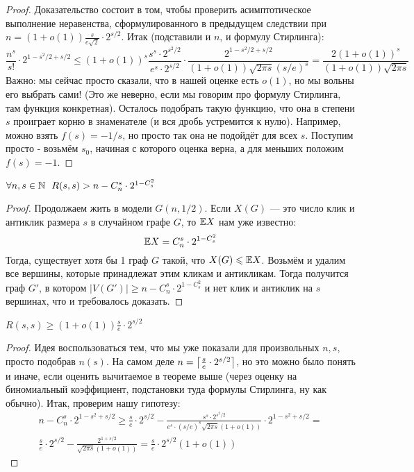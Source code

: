 \begin{proof}
	Доказательство состоит в том, чтобы проверить асимптотическое выполнение неравенства, сформулированного в предыдущем следствии при $n = (1 + o(1))\frac{s}{e\sqrt{2}} \cdot 2^{s / 2}$. Итак (подставили и $n$, и формулу Стирлинга):
	\[
		\frac{n^s}{s!} \cdot 2^{1 - s^2 / 2 + s / 2} \le (1 + o(1))^s \frac{s^s \cdot 2^{s^2 / 2}}{e^s \cdot 2^{s / 2}} \cdot \frac{2^{1 - s^2 / 2 + s / 2}}{(1 + o(1))\sqrt{2\pi s} (s / e)^s} = \frac{2(1 + o(1))^s}{(1 + o(1))\sqrt{2\pi s}}
	\]
	Важно: мы сейчас просто сказали, что в нашей оценке есть $o(1)$, но мы вольны его выбрать сами! (Это же неверно, если мы говорим про формулу Стирлинга, там функция конкретная). Осталось подобрать такую функцию, что она в степени $s$ проиграет корню в знаменателе (и вся дробь устремится к нулю). Например, можно взять $f(s) = -1 / s$, но просто так она не подойдёт для всех $s$. Поступим просто - возьмём $s_0$, начиная с которого оценка верна, а для меньших положим $f(s) = -1$.
\end{proof}

\begin{theorem}
	$\forall n, s \in \mathbb{N}\ \ R(s, s) > n - C_n^s \cdot 2^{1 - C_s^2}$
\end{theorem}

\begin{proof}
	Продолжаем жить в модели $G(n, 1 / 2)$. Если $X(G)$ --- это число клик и антиклик размера $s$ в случайном графе $G$, то $\mathbb{E} X$ нам уже известно:
	\[
		\mathbb{E} X = C_n^s \cdot 2^{1 - C_s^2}
	\]
	Тогда, существует хотя бы 1 граф $G$ такой, что $X(G) \leqslant \mathbb{E} X$. Возьмём и удалим все вершины, которые принадлежат этим кликам и антикликам. Тогда получится граф $G'$, в котором $|V(G')| \ge n - C_n^s \cdot 2^{1 - C_s^2}$ и нет клик и антиклик на $s$ вершинах, что и требовалось доказать.
\end{proof}

\begin{corollary}
	\(R(s, s) \ge (1 + o(1))\frac{s}{e} \cdot 2^{s / 2}\)
\end{corollary}

\begin{proof}
	Идея воспользоваться тем, что мы уже показали для произвольных $n, s$, просто подобрав $n(s)$. На самом деле $n = \left\lceil \frac{s}{e} \cdot 2^{s / 2} \right\rceil$, но это можно было понять и иначе, если оценить вычитаемое в теореме выше (через оценку на биномиальный коэффициент, подстановки туда формулы Стирлинга, ну как обычно). Итак, проверим нашу гипотезу:
	\begin{multline*}
		n - C_n^s \cdot 2^{1 - s^2 + s / 2} \ge \frac{s}{e} \cdot 2^{s / 2} - \frac{s^s \cdot 2^{s^2 / 2}}{e^s \cdot (s / e)^s \sqrt{2\pi s} (1 + o(1))} \cdot 2^{1 - s^2 + s / 2} =
		\\
		\frac{s}{e} \cdot 2^{s / 2} - \frac{2^{1 + s / 2}}{\sqrt{2\pi s}(1 + o(1))} = \frac{s}{e} \cdot 2^{s / 2}(1 + o(1))
	\end{multline*}
\end{proof}